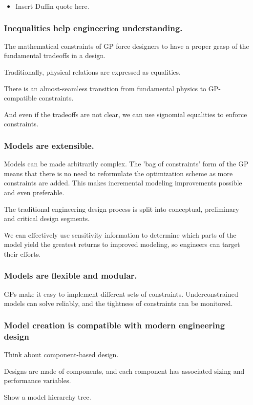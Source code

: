 \documentclass{aiaa-pretty}
\begin{document}
\begin{itemize}
	\item Insert Duffin quote here. 
\end{itemize}
\subsubsection{Inequalities help engineering understanding.}
The mathematical constraints of \gls{GP} force designers to have a proper grasp of the fundamental tradeoffs in a design.

Traditionally, physical relations are expressed as equalities.  

There is an almost-seamless transition from fundamental physics to GP-compatible constraints.

And even if the tradeoffs are not clear, we can use signomial equalities to enforce constraints. 

\subsubsection{Models are extensible.}
Models can be made arbitrarily complex. The 'bag of constraints' form of the GP means that there is no need to reformulate the optimization scheme as more constraints are added. This makes incremental modeling improvements possible and even preferable. 

The traditional engineering design process is split into conceptual, preliminary and critical design segments. 

We can effectively use sensitivity information to determine which parts of the model yield the greatest returns to improved modeling, so engineers can target their efforts. 
\subsubsection{Models are flexible and modular.}
\gls{GP}s make it easy to implement different sets of constraints. 
Underconstrained models can solve reliably, and the tightness of constraints can be monitored. 
\subsubsection{Model creation is compatible with modern engineering design }
Think about component-based design. 

Designs are made of components, and each component has associated sizing and performance variables. 

Show a model hierarchy tree. 
	
\end{document}
